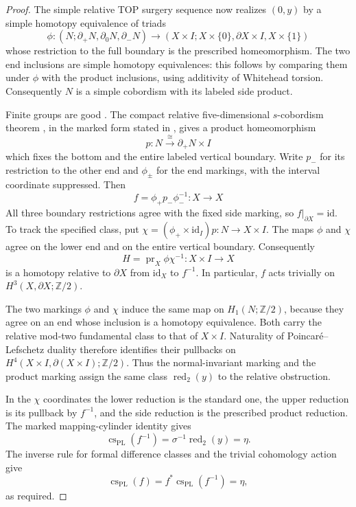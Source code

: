 \begin{proof}
The simple relative TOP surgery sequence
\cite[Theorem~11.3A, p.~200]{FreedmanQuinn1990}
now realizes $(0,y)$ by a simple homotopy equivalence of triads
\[
 \phi:(N;\partial_+N,\partial_0N,\partial_-N)
   \longrightarrow
 (X\times I;X\times\{0\},\partial X\times I,X\times\{1\})
\]
whose restriction to the full boundary is the prescribed
homeomorphism.  The two end inclusions are simple homotopy
equivalences: this follows by comparing them under $\phi$
with the product inclusions, using additivity of Whitehead
torsion.  Consequently $N$ is a simple cobordism with its
labeled side product.

Finite groups are good
\cite[p.~99]{FreedmanQuinn1990}.  The compact relative
five-dimensional $s$-cobordism theorem
\cite[Theorem~7.1A, p.~101]{FreedmanQuinn1990}, in the marked
form stated in
\cite[Proposition~4.10, pp.~2526--2527]{Galvin2026CassonSullivan},
gives a product homeomorphism
\[
            p:N\xrightarrow{\cong}\partial_+N\times I
\]
which fixes the bottom and the entire labeled vertical
boundary.  Write $p_-$ for its restriction to the other end
and $\phi_\pm$ for the end markings, with the interval
coordinate suppressed.  Then
\[
                 f=\phi_+p_-\phi_-^{-1}:X\longrightarrow X
\]
All three boundary restrictions agree with the fixed side marking,
so $f|_{\partial X}=\mathrm{id}$.  To track the specified class,
put $\chi=(\phi_+\times\mathrm{id}_I)p:N\to X\times I$.
The maps $\phi$ and $\chi$ agree on the lower end and on the
entire vertical boundary.  Consequently
\[
 H=\operatorname{pr}_X\phi\chi^{-1}:X\times I\longrightarrow X
\]
is a homotopy relative to $\partial X$ from $\mathrm{id}_X$
to $f^{-1}$.  In particular, $f$ acts trivially on
$H^3(X,\partial X;\mathbb Z/2)$.

The two markings $\phi$ and $\chi$ induce the same map on
$H_1(N;\mathbb Z/2)$, because they agree on an end whose
inclusion is a homotopy equivalence.  Both carry the relative
mod-two fundamental class to that of $X\times I$.
Naturality of Poincar\'e--Lefschetz duality therefore identifies
their pullbacks on $H^4(X\times I,\partial(X\times I);\mathbb Z/2)$.
Thus the normal-invariant marking and the product marking assign
the same class $\operatorname{red}_2(y)$ to the relative
obstruction.

In the $\chi$ coordinates the lower reduction is the standard
one, the upper reduction is its pullback by $f^{-1}$, and the
side reduction is the prescribed product reduction.  The marked
mapping-cylinder identity
\cite[Lemma~4.12, p.~2527]{Galvin2026CassonSullivan} gives
\[
 \operatorname{cs}_{\mathrm{PL}}(f^{-1})
       =\sigma^{-1}\operatorname{red}_2(y)=\eta.
\]
The inverse rule for formal difference classes and the trivial
cohomology action give
\[
 \operatorname{cs}_{\mathrm{PL}}(f)
   =f^*\operatorname{cs}_{\mathrm{PL}}(f^{-1})=\eta,
\]
as required.
\end{proof}

